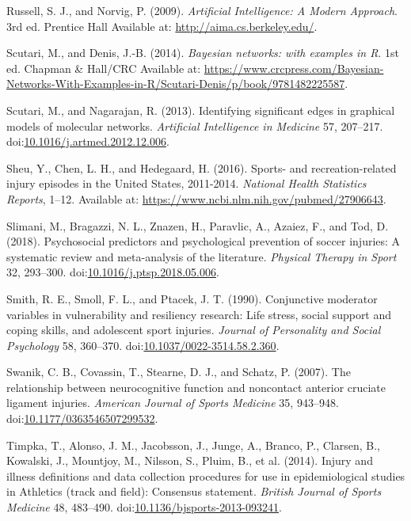 \documentclass[
  english,
  man,floatsintext]{apa6}
\newlength{\cslhangindent}
\newenvironment{cslreferences}%
  {\setlength{\parindent}{0pt}%
  \everypar{\setlength{\hangindent}{\cslhangindent}}\ignorespaces}%
  {\par}
\begin{document}
\begin{cslreferences}
\leavevmode\hypertarget{ref-Norvig2009}{}%
Russell, S. J., and Norvig, P. (2009). \emph{Artificial Intelligence: A Modern Approach}. 3rd ed. Prentice Hall Available at: \url{http://aima.cs.berkeley.edu/}.

\leavevmode\hypertarget{ref-Scutari2014}{}%
Scutari, M., and Denis, J.-B. (2014). \emph{Bayesian networks: with examples in R}. 1st ed. Chapman \& Hall/CRC Available at: \url{https://www.crcpress.com/Bayesian-Networks-With-Examples-in-R/Scutari-Denis/p/book/9781482225587}.

\leavevmode\hypertarget{ref-Scutari2013}{}%
Scutari, M., and Nagarajan, R. (2013). Identifying significant edges in graphical models of molecular networks. \emph{Artificial Intelligence in Medicine} 57, 207--217. doi:\href{https://doi.org/10.1016/j.artmed.2012.12.006}{10.1016/j.artmed.2012.12.006}.

\leavevmode\hypertarget{ref-Sheu2016}{}%
Sheu, Y., Chen, L. H., and Hedegaard, H. (2016). Sports- and recreation-related injury episodes in the United States, 2011-2014. \emph{National Health Statistics Reports}, 1--12. Available at: \url{https://www.ncbi.nlm.nih.gov/pubmed/27906643}.

\leavevmode\hypertarget{ref-Slimani2018}{}%
Slimani, M., Bragazzi, N. L., Znazen, H., Paravlic, A., Azaiez, F., and Tod, D. (2018). Psychosocial predictors and psychological prevention of soccer injuries: A systematic review and meta-analysis of the literature. \emph{Physical Therapy in Sport} 32, 293--300. doi:\href{https://doi.org/10.1016/j.ptsp.2018.05.006}{10.1016/j.ptsp.2018.05.006}.

\leavevmode\hypertarget{ref-Smith1990}{}%
Smith, R. E., Smoll, F. L., and Ptacek, J. T. (1990). Conjunctive moderator variables in vulnerability and resiliency research: Life stress, social support and coping skills, and adolescent sport injuries. \emph{Journal of Personality and Social Psychology} 58, 360--370. doi:\href{https://doi.org/10.1037/0022-3514.58.2.360}{10.1037/0022-3514.58.2.360}.

\leavevmode\hypertarget{ref-Swanik2007}{}%
Swanik, C. B., Covassin, T., Stearne, D. J., and Schatz, P. (2007). The relationship between neurocognitive function and noncontact anterior cruciate ligament injuries. \emph{American Journal of Sports Medicine} 35, 943--948. doi:\href{https://doi.org/10.1177/0363546507299532}{10.1177/0363546507299532}.

\leavevmode\hypertarget{ref-Timpka2014}{}%
Timpka, T., Alonso, J. M., Jacobsson, J., Junge, A., Branco, P., Clarsen, B., Kowalski, J., Mountjoy, M., Nilsson, S., Pluim, B., et al. (2014). Injury and illness definitions and data collection procedures for use in epidemiological studies in Athletics (track and field): Consensus statement. \emph{British Journal of Sports Medicine} 48, 483--490. doi:\href{https://doi.org/10.1136/bjsports-2013-093241}{10.1136/bjsports-2013-093241}.


\end{cslreferences}
\end{document}
